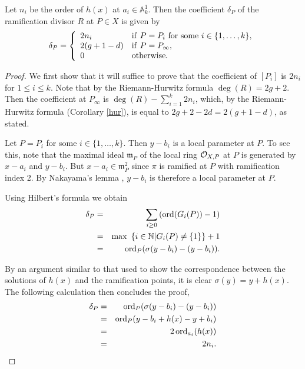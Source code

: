 \begin{lem}\label{char2ramification}
 Let $n_i$ be the order of $h(x)$ at $a_i\in \mathbb A_k^1$.
Then the coefficient $\delta_P$ of the ramification divisor $R$ at $P\in X$ is given by
\[
 \delta_P = \left\{
 \begin{array}{ll}
 2n_i & {\rm if }\ P=P_i\ {\rm for\ some }\ i \in \{1,\ldots ,k\}, \\
 2(g+1-d) & {\rm if }\  P=P_\infty, \\
 0 & {\rm otherwise.} 
 \end{array}
\right.
\]
\end{lem}
\begin{proof}
 We first show that it will suffice to prove that the coefficient of $[P_i]$ is $2n_i$ for $1\leq i \leq k$.
 Note that by the Riemann-Hurwitz formula $\deg(R) = 2g+2$.
 Then the coefficient at $P_\infty$ is $\deg(R) - \sum_{i=1}^k2n_i$, which, by the Riemann-Hurwitz formula (Corollary \ref{hur}), is equal to $2g+2-2d = 2(g+1-d)$, as stated.
 
 Let $P=P_i$ for some $i\in \{1,\ldots , k\}$.
 Then $y-b_i$ is a local parameter at $P$.
 To see this, note that the maximal ideal $\mathfrak m_{P}$ of the local ring ${\cal O}_{X,P}$ at $P$ is generated by $x-a_i$ and $y-b_i$.
 But $x-a_i\in \mathfrak m_{P}^2$ since $\pi$ is ramified at $P$ with ramification index 2.
 By Nakayama's lemma \cite[Prop. 2.6]{atiyahmacdonald}, $y-b_i$ is therefore a local parameter at $P$.
 
 Using Hilbert's formula \cite[Prop 4, \S 1, Ch IV]{localfields} we obtain
 \begin{eqnarray*}
  \delta_P & = & \sum_{i\geq 0} \left(\operatorname{ord}(G_i(P))-1\right) \\
  & = & {\rm max\ }\left\{ i\in {\mathbb N} | G_i(P)\neq \{1\}\right\} + 1 \\
  & = & \operatorname{ord}_{P}(\sigma(y-b_i) - (y-b_i)).
  \end{eqnarray*}
  
 By an argument similar to that used to show the correspondence between the solutions of $h(x)$ and the ramification points, it is clear $\sigma(y)=y+h(x)$.
 The following calculation then concludes the proof,
  \begin{eqnarray*}
  \delta_P & = & \operatorname{ord}_{P}(\sigma(y-b_i) - (y-b_i)) \\
  & = & \operatorname{ord}_{P}(y-b_i+h(x) - y + b_i) \\
  & = & 2\operatorname{ord}_{a_i}(h(x)) \\
  & = & 2n_i.
 \end{eqnarray*}
\end{proof}




